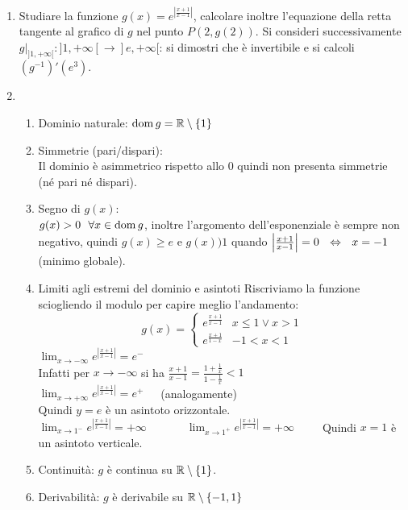 \documentclass{article}
\begin{document}
\begin{enumerate}[label=\textbf{Esercizio 6.\arabic*.},itemindent=*]
    \item Studiare la funzione $\displaystyle g(x)=e^{\left|\frac{x+1}{x-1}\right|}$, calcolare inoltre l'equazione della retta tangente al grafico di $g$ nel punto $P(2,g(2))$. Si consideri successivamente $g|_{]1,+\infty[}:]1,+\infty[\to ]e,+\infty[$: si dimostri che è invertibile e si calcoli $(g^{-1})'(e^3)$.
    \item[\textit{\large Soluzione~}]~
    \begin{enumerate}[label=\arabic*.,itemindent=*]
        \item Dominio naturale: $\operatorname{dom} g=\mathbb{R}\setminus \{1\}$
        \item Simmetrie (pari/dispari):\\
        Il dominio è asimmetrico rispetto allo 0 quindi non presenta simmetrie (né pari né dispari).
        \item Segno di $g(x)$:
        \\ $g(x)>0 ~~\forall x \in \operatorname{dom} g$, inoltre l'argomento dell'esponenziale è sempre non negativo, quindi $g(x)\geq e$ e $g(x))1$ quando $\left|\frac{x+1}{x-1}\right|=0 ~~\Leftrightarrow~~x=-1$ (minimo globale).
        \item Limiti agli estremi del dominio e asintoti
            Riscriviamo la funzione sciogliendo il modulo per capire meglio l'andamento:
            \[g(x)=\begin{cases}
                e^{\frac{x+1}{x-1}}&x\leq 1\lor x>1\\
                e^\frac{x+1}{1-x}&-1<x<1
            \end{cases}\]
            $\displaystyle\lim_{x\to-\infty}e^{\left|\frac{x+1}{x-1}\right|}=e^-$\\
            Infatti per $x  \to -\infty$ si ha $\frac{x+1}{x-1}=\frac{1+\frac{1}{x}}{1-\frac{1}{x}}<1$\\
            $\displaystyle\lim_{x\to+\infty}e^{\left|\frac{x+1}{x-1}\right|}=e^+$~~~(analogamente)\\
            Quindi $y=e$ è un asintoto orizzontale.\\
            $\displaystyle\lim_{x\to1^-}e^{\left|\frac{x+1}{x-1}\right|}=+\infty$~~~~~~~$\displaystyle\lim_{x\to1^+}e^{\left|\frac{x+1}{x-1}\right|}=+\infty$~~~~~Quindi $x=1$ è un asintoto verticale.
        \item Continuità: $g$ è continua su $\mathbb{R}\setminus\{1\}$.
        \item Derivabilità: $g$ è derivabile su $\mathbb{R}\setminus\{-1,1\}$

\end{enumerate}
\end{enumerate}
\end{document}
